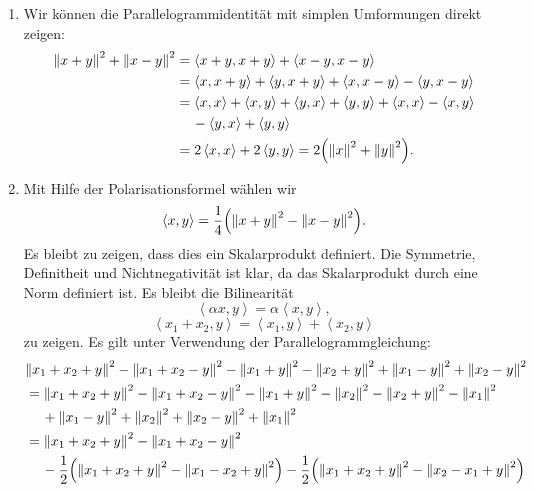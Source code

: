 \documentclass[german,12pt]{homework}
\newcommand{\dotproduct}[2]{\left\langle#1, #2\right\rangle}
\DeclarePairedDelimiter{\norm}{\lVert}{\rVert}
\DeclarePairedDelimiter{\enbrace}{(}{)}
\begin{document}
    \begin{enumerate}
        \item Wir können die Parallelogrammidentität mit simplen Umformungen
        direkt zeigen:
        \begin{align*}
            \norm*{x + y}^2 + \norm*{x - y}^2 &= \dotproduct{x + y}{x + y} +
            \dotproduct{x - y}{x - y}\\
            &= \dotproduct{x}{x + y} + \dotproduct{y}{x + y} + \dotproduct{x}{x
            - y} - \dotproduct{y}{x - y}\\
            &= \dotproduct{x}{x} + \dotproduct{x}{y} + \dotproduct{y}{x} +
            \dotproduct{y}{y} + \dotproduct{x}{x} - \dotproduct{x}{y}\\
            &\quad\, - \dotproduct{y}{x} + \dotproduct{y}{y}\\
            &= 2\dotproduct{x}{x} + 2\dotproduct{y}{y} = 2\enbrace*{\norm*{x}^2
            + \norm*{y}^2}.
        \end{align*}
        \item Mit Hilfe der Polarisationsformel wählen wir
        \[\dotproduct{x}{y} = \frac{1}{4}\enbrace*{\norm*{x + y}^2 - \norm*{x -
        y}^2}.\]
        Es bleibt zu zeigen, dass dies ein Skalarprodukt definiert. Die
        Symmetrie, Definitheit und Nichtnegativität ist klar, da das
        Skalarprodukt durch eine Norm definiert ist. Es bleibt die Bilinearität
        \[\dotproduct{\alpha{x}}{y} = \alpha\dotproduct{x}{y},\]
        \[\dotproduct{x_1 + x_2}{y} = \dotproduct{x_1}{y} +
        \dotproduct{x_2}{y}\]
        zu zeigen. Es gilt unter Verwendung der Parallelogrammgleichung:
        \begin{align*}
            &\norm*{x_1 + x_2 + y}^2 - \norm*{x_1 + x_2 - y}^2 - \norm*{x_1 +
            y}^2 - \norm*{x_2 + y}^2 + \norm*{x_1 - y}^2 + \norm*{x_2 - y}^2\\
            &= \norm*{x_1 + x_2 + y}^2 - \norm*{x_1 + x_2 - y}^2 - \norm*{x_1 +
            y}^2 - \norm*{x_2}^2 - \norm*{x_2 + y}^2 - \norm*{x_1}^2\\
            &\quad\, + \norm*{x_1 - y}^2 + \norm*{x_2}^2 + \norm*{x_2 - y}^2 +
            \norm*{x_1}^2\\
            &= \norm*{x_1 + x_2 + y}^2 - \norm*{x_1 + x_2 - y}^2\\
            &\quad\, - \frac{1}{2}\enbrace*{\norm*{x_1 + x_2 + y}^2 -
            \norm*{x_1 - x_2 + y}^2} - \frac{1}{2}\enbrace*{\norm*{x_1 + x_2 +
            y}^2 - \norm*{x_2 - x_1 + y}^2}\\

\end{align*}
\end{enumerate}
\end{document}
